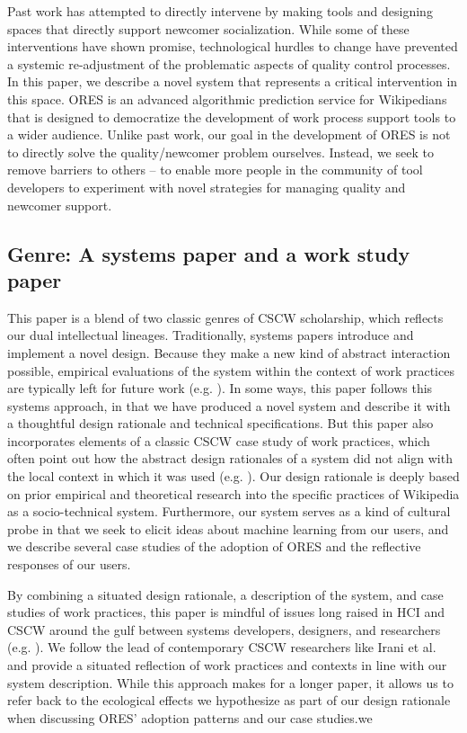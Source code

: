 Past work has attempted to directly intervene by making tools\cite{halfaker2014snuggle} and designing spaces\cite{morgan2013tea} that directly support newcomer socialization.  While some of these interventions have shown promise\cite{morgan2018evaluating}, technological hurdles to change have prevented a systemic re-adjustment of the problematic aspects of quality control processes\cite{halfaker2014snuggle}. In this paper, we describe a novel system that represents a critical intervention in this space.  ORES is an advanced algorithmic prediction service for Wikipedians that is designed to democratize the development of work process support tools to a wider audience. Unlike past work, our goal in the development of ORES is not to directly solve the quality/newcomer problem ourselves.  Instead, we seek to remove barriers to others -- to enable more people in the community of tool developers to experiment with novel strategies for managing quality and newcomer support.

\subsection{Genre: A systems paper and a work study paper}
This paper is a blend of two classic genres of CSCW scholarship, which reflects our dual intellectual lineages. Traditionally, systems papers introduce and implement a novel design. Because they make a new kind of abstract interaction possible, empirical evaluations of the system within the context of work practices are typically left for future work (e.g. \cite{resnick1994grouplens}). In some ways, this paper follows this systems approach, in that we have produced a novel system and describe it with a thoughtful design rationale and technical specifications. But this paper also incorporates elements of a classic CSCW case study of work practices, which often point out how the abstract design rationales of a system did not align with the local context in which it was used (e.g. \cite{star1994steps}). Our design rationale is deeply based on prior empirical and theoretical research into the specific practices of Wikipedia as a socio-technical system. Furthermore, our system serves as a kind of cultural probe in that we seek to elicit ideas about machine learning from our users, and we describe several case studies of the adoption of ORES and the reflective responses of our users.

By combining a situated design rationale, a description of the system, and case studies of work practices, this paper is mindful of issues long raised in HCI and CSCW around the gulf between systems developers, designers, and researchers (e.g. \cite{gentner1990good, dourish2006implications, grudin1988cscw}). We follow the lead of contemporary CSCW researchers like Irani et al.\cite{irani2013turkopticon} and provide a situated reflection of work practices and contexts in line with our system description. While this approach makes for a longer paper, it allows us to refer back to the ecological effects we hypothesize as part of our design rationale when discussing ORES' adoption patterns and our case studies.we

